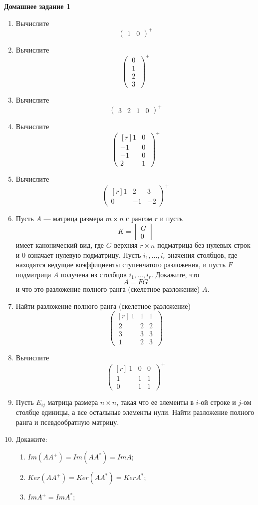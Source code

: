 \documentclass[12pt]{article}
\theoremstyle{definition}
\numberwithin{equation}{section}
\begin{document}
\textbf{Домашнее задание 1}\begin{enumerate}
\item Вычислите \[\begin{pmatrix} 1&0\end{pmatrix}^+\]
\item Вычислите \[\begin{pmatrix} ~0~\\~1~\\~2~\\~3~\end{pmatrix}^+\]
\item Вычислите \[\begin{pmatrix} 3&2&1&0 \end{pmatrix}^+\]
\item Вычислите \[\begin{pmatrix}[r] 1&0~\\-1 & 0~\\-1 & 0~\\ 2&1~\end{pmatrix}^+\]
\item Вычислите  \[\begin{pmatrix}[r] 1&2&3\\0 & -1 & -2\end{pmatrix}^+\]
\item Пусть $A $ --- матрица размера $m\times n$
с рангом $r$ и пусть
$$
 K = \left[ \begin{array}{c} G \\ \hline  0\end{array} \right]
$$
имеет канонический вид,
где $G$ верхняя $r\times n$ подматрица без нулевых строк и
$0$ означает нулевую подматрицу. Пусть $i_1, \dots ,i_r$ значения столбцов, где находятся ведущие коэффициенты ступенчатого разложения, и пусть $F$ подматрица $A$ получена из столбцов $i_1,
\dots , i_r$.  Докажите, что
$$
A = FG
$$
 и что это разложение полного ранга (скелетное разложение) $A$.
\item Найти разложение полного ранга (скелетное разложение)
\[\begin{pmatrix}[r] ~1&1&1~\\~2 & 2 & 2~\\~3 & 3 & 3~\\ ~1&2&3~\end{pmatrix}\]
\item Вычислите  \[\begin{pmatrix}[r] ~1&0&0~\\~1 & 1 & 1~\\~0 & 1 & 1~\end{pmatrix}^+\]
\item Пусть $E_{ij}$ матрица размера $n\times n$, такая что ее элементы в $i$-ой строке и $j$-ом столбце единицы, а все остальные элементы нули. Найти разложение полного ранга и псевдообратную матрицу.
\item Докажите:\begin{enumerate}
\item $Im(AA^+) = Im(AA^*) = Im A$;
\item $Ker (AA^+) = Ker (AA^*) = Ker A^*$;
\item $Im A^+ = Im A^*$;
\end{enumerate}
\end{enumerate}
\end{document}
